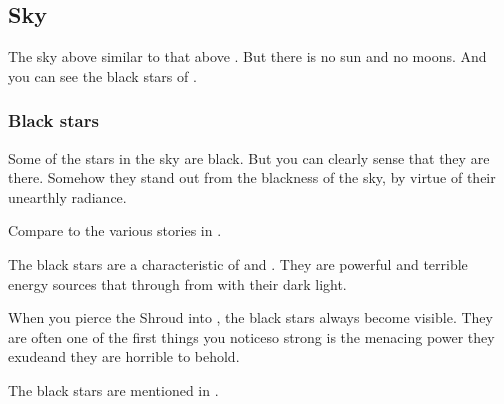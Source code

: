 








\subsection{Sky}
The sky above \Nyx{} similar to that above \Azmith.
But there is no sun and no moons. 
And you can see the black stars of \Erebos. 





\subsubsection{Black stars}
Some of the stars in the \Nyxian{} sky are black. But you can clearly sense that they are there. Somehow they stand out from the blackness of the sky, by virtue of their unearthly radiance. 

Compare to the various stories in .


The black stars are a characteristic of \Nyx{} and \Erebos. They are powerful and terrible energy sources that  through from \Erebos{} with their dark light. 

When you pierce the Shroud into \Nyx, the black stars always become visible. They are often one of the first things you notice\dash so strong is the menacing power they exude\dash and they are horrible to behold. 

The black stars are mentioned in \emph{}. 








